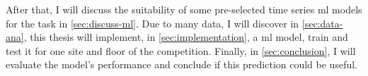 After that, I will discuss the suitability of some pre-selected time series \ac{ml} models for the task in \cref{sec:discuss-ml}. 
Due to many data, I will discover in \cref{sec:data-ana}, this thesis will implement, in \cref{sec:implementation}, a \ac{ml} model, train and test it for one site and floor of the competition.
Finally, in \cref{sec:conclusion}, I will evaluate the model's performance and conclude if this prediction could be useful.

